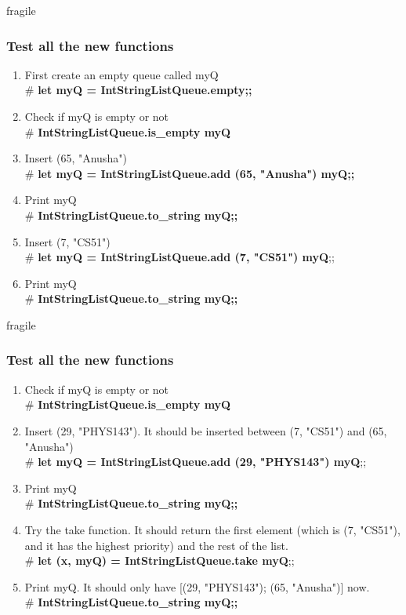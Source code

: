 \documentclass{beamer}
\begin{document}
\begin{frame}{fragile}
\frametitle{Test all the new functions}

\begin{example}
\begin{enumerate}
\item First create an empty queue called myQ \\
        \# {\bf  let myQ  = IntStringListQueue.empty;;}
\item Check if myQ is empty or not \\
        \# {\bf IntStringListQueue.is\_empty myQ}
\item Insert (65, "Anusha")\\
 \# {\bf let myQ = IntStringListQueue.add (65, "Anusha") myQ;; }
 \item Print myQ\\
\# {\bf IntStringListQueue.to\_string myQ;;}
\item Insert (7, "CS51")\\
 \# {\bf let myQ = IntStringListQueue.add (7, "CS51") myQ};;
 \item Print myQ\\
\# {\bf IntStringListQueue.to\_string myQ;;}
\end{enumerate}
\end{example}

\end{frame}




\begin{frame}{fragile}
\frametitle{Test all the new functions}

\begin{example}
\begin{enumerate}
\item Check if myQ is empty or not \\
        \# {\bf IntStringListQueue.is\_empty myQ}
\item Insert (29, "PHYS143"). It should be inserted between (7, "CS51") and (65, "Anusha")\\
 \# {\bf let myQ = IntStringListQueue.add (29, "PHYS143") myQ};;
 \item Print myQ\\
\# {\bf IntStringListQueue.to\_string myQ;;}
\item Try the take function. It should return the first element (which is (7, "CS51"), and it has the highest priority) and the rest of the list. \\
 \# {\bf let (x, myQ) = IntStringListQueue.take myQ};;
 \item Print myQ. It should only have [(29, "PHYS143"); (65, "Anusha")] now.\\
\# {\bf IntStringListQueue.to\_string myQ;;}
\end{enumerate}
\end{example}
\end{frame}
\end{document}
